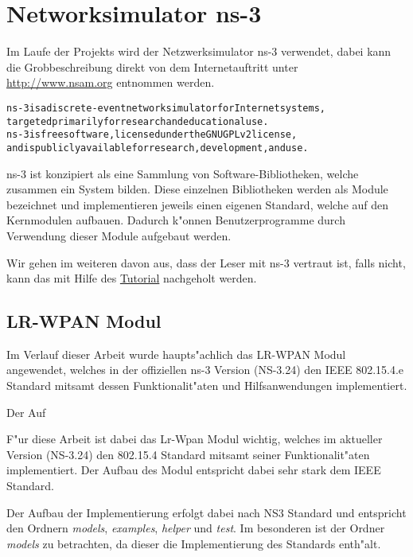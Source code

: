 \section{Networksimulator ns-3} \label{Kap5-5}

Im Laufe der Projekts wird der Netzwerksimulator ns-3 verwendet, dabei
kann die Grobbeschreibung direkt von dem Internetauftritt unter
\href{http://www.nsam.org}{http://www.nsam.org} entnommen werden.

\begin{alltt}
ns-3 is a discrete-event network simulator for Internet systems,
targeted primarily for research and educational use.
ns-3 is free software, licensed under the GNU GPLv2 license,
and is publicly available for research, development, and use.
\end{alltt}

ns-3 ist konzipiert als eine Sammlung von Software-Bibliotheken, welche zusammen
ein System bilden. Diese einzelnen Bibliotheken werden als Module bezeichnet
und implementieren jeweils einen eigenen Standard, welche auf den Kernmodulen
aufbauen. Dadurch k"onnen Benutzerprogramme durch Verwendung dieser Module
aufgebaut werden.

Wir gehen im weiteren davon aus, dass der Leser mit ns-3 vertraut ist,
falls nicht, kann das mit Hilfe des \href{https://www.nsnam.org/ns-3-24/documentation/}{Tutorial}
nachgeholt werden.

\subsection{LR-WPAN Modul}

Im Verlauf dieser Arbeit wurde haupts"achlich das LR-WPAN Modul angewendet, welches
in der offiziellen ns-3 Version (NS-3.24) den IEEE 802.15.4.e Standard mitsamt
dessen Funktionalit"aten und Hilfsanwendungen implementiert.

Der Auf

F"ur diese Arbeit ist dabei das Lr-Wpan Modul wichtig, welches im aktueller Version
(NS-3.24) den 802.15.4 Standard mitsamt seiner Funktionalit"aten implementiert.
Der Aufbau des Modul entspricht dabei sehr stark dem IEEE Standard.

Der Aufbau der Implementierung erfolgt dabei nach NS3 Standard und entspricht
den Ordnern \textit{models}, \textit{examples}, \textit{helper} und \textit{test}.
Im besonderen ist der Ordner \textit{models} zu betrachten, da dieser die Implementierung
des Standards enth"alt.

